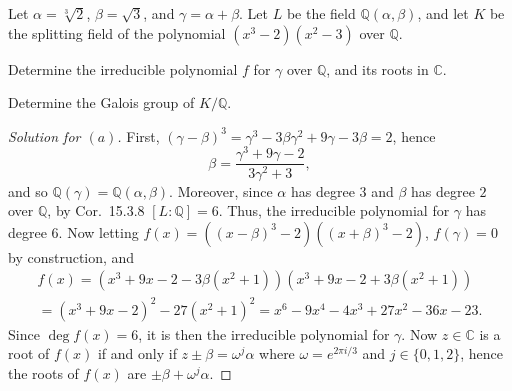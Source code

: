 \documentclass[12pt]{article}
\theoremstyle{remark}
\begin{document}
\begin{problem}
  Let $\alpha = \sqrt[3]{2}$, $\beta = \sqrt{3}$, and $\gamma = \alpha + \beta$. Let $L$ be the field $\mathbb{Q}(\alpha,\beta)$, and let $K$ be the splitting field of the polynomial $(x^3 - 2) (x^2 - 3)$ over $\mathbb{Q}$.
  \begin{enum}
    \item Determine the irreducible polynomial $f$ for $\gamma$ over $\mathbb{Q}$, and its roots in $\mathbb{C}$.
    \item Determine the Galois group of $K/\mathbb{Q}$.
  \end{enum}
\end{problem}
\begin{proof}[Solution for $(a)$]
  First, $(\gamma - \beta)^3 = \gamma^3 - 3\beta\gamma^2 + 9\gamma - 3\beta = 2$, hence
  \begin{equation*}
    \beta = \frac{\gamma^3 + 9\gamma - 2}{3\gamma^2 + 3},
  \end{equation*}
  and so $\mathbb{Q}(\gamma) = \mathbb{Q}(\alpha,\beta)$. Moreover, since $\alpha$ has degree $3$ and $\beta$ has degree $2$ over $\mathbb{Q}$, by Cor.~15.3.8 $[L:\mathbb{Q}] = 6$. Thus, the irreducible polynomial for $\gamma$ has degree $6$. Now letting $f(x) = ((x-\beta)^3-2)((x+\beta)^3-2)$, $f(\gamma) = 0$ by construction, and
  \begin{multline*}
    f(x) = (x^3 + 9x - 2 - 3\beta(x^2 + 1))(x^3 + 9x - 2 + 3\beta(x^2 + 1))\\
    = (x^3 + 9x - 2)^2 - 27(x^2 + 1)^2 = x^6 - 9 x^4 - 4 x^3 + 27 x^2 - 36 x - 23.
  \end{multline*}
  Since $\deg f(x) = 6$, it is then the irreducible polynomial for $\gamma$. Now $z \in \mathbb{C}$ is a root of $f(x)$ if and only if $z \pm \beta = \omega^j\alpha$ where $\omega = e^{2 \pi i/3}$ and $j \in \{0,1,2\}$, hence the roots of $f(x)$ are $\pm\beta + \omega^j\alpha$.
\end{proof}
\end{document}
